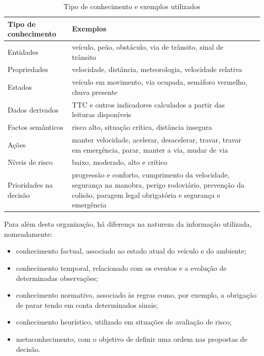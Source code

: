 \begin{table}[H]
  \centering
  \caption{Tipo de conhecimento e exemplos utilizados}
  \label{tab:tipos-conhecimento}
  \small
  \begin{tabularx}{\textwidth}{@{}L{3.6cm}VX@{}}
    \toprule
    \textbf{Tipo de conhecimento} & \textbf{Exemplos} \\
    \midrule
    Entidades & veículo, peão, obstáculo, via de trânsito, sinal de trânsito \\ \linhasep
    Propriedades & velocidade, distância, meteorologia, velocidade relativa \\ \linhasep
    Estados & veículo em movimento, via ocupada, semáforo vermelho, chuva
      presente \\ \linhasep
    Dados derivados & TTC e outros indicadores calculados a partir das leituras
      disponíveis \\ \linhasep
    Factos semânticos & risco alto, situação crítica, distância insegura \\ \linhasep
    Ações & manter velocidade, acelerar, desacelerar, travar, travar em
      emergência, parar, manter a via, mudar de via \\ \linhasep
    Níveis de risco & baixo, moderado, alto e crítico \\ \linhasep
    Prioridades na decisão & progressão e conforto, cumprimento da velocidade,
      segurança na manobra, perigo rodoviário, prevenção da colisão, paragem
      legal obrigatória e segurança e emergência \\
    \bottomrule
  \end{tabularx}
\end{table}

Para além desta organização, há diferença na natureza da informação
utilizada, nomeadamente:
\begin{itemize}
  \item conhecimento factual, associado ao estado atual do veículo e do
    ambiente;
  \item conhecimento temporal, relacionado com os eventos e a evolução de
    determinadas observações;
  \item conhecimento normativo, associado às regras como, por exemplo, a
    obrigação de parar tendo em conta determinados sinais;
  \item conhecimento heurístico, utilizado em situações de avaliação de risco;
  \item metaconhecimento, com o objetivo de definir uma ordem nas propostas de
    decisão.
\end{itemize}

